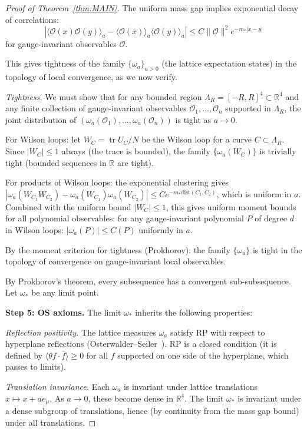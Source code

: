 \documentclass[11pt,a4paper]{article}
\theoremstyle{plain}
\theoremstyle{definition}
\theoremstyle{remark}
\newcommand{\R}{\mathbb{R}}
\newcommand{\tr}{\operatorname{tr}}
\newcommand{\cO}{\mathcal{O}}
\begin{document}
\begin{proof}[Proof of Theorem~\ref{thm:MAIN}]
The uniform mass gap implies exponential decay of
correlations:
\begin{equation}
  |\langle \cO(x) \cO(y) \rangle_a
  - \langle \cO(x) \rangle_a \langle \cO(y) \rangle_a|
  \le C \|\cO\|^2 e^{-m_* |x-y|}
\end{equation}
for gauge-invariant observables $\cO$.

This gives tightness of the family $\{\omega_a\}_{a > 0}$
(the lattice expectation states) in the topology of
local convergence, as we now verify.

\emph{Tightness.} We must show that for any bounded
region $\Lambda_R = [-R, R]^4 \subset \R^4$ and any
finite collection of gauge-invariant observables
$\cO_1, \ldots, \cO_n$ supported in $\Lambda_R$,
the joint distribution of
$(\omega_a(\cO_1), \ldots, \omega_a(\cO_n))$ is
tight as $a \to 0$.

For Wilson loops: let $W_C = \tr U_C / N$ be the
Wilson loop for a curve $C \subset \Lambda_R$.
Since $|W_C| \le 1$ always (the trace is bounded),
the family $\{\omega_a(W_C)\}$ is trivially tight
(bounded sequences in $\R$ are tight).

For products of Wilson loops: the exponential clustering
gives $|\omega_a(W_{C_1}W_{C_2})
- \omega_a(W_{C_1})\omega_a(W_{C_2})|
\le C e^{-m_* \mathrm{dist}(C_1,C_2)}$, which is
uniform in $a$. Combined with the uniform bound
$|W_C| \le 1$, this gives uniform moment bounds for
all polynomial observables: for any gauge-invariant
polynomial $P$ of degree $d$ in Wilson loops:
$|\omega_a(P)| \le C(P)$ uniformly in $a$.

By the moment criterion for tightness (Prokhorov):
the family $\{\omega_a\}$ is tight in the topology of
convergence on gauge-invariant local observables.

By Prokhorov's theorem, every subsequence has a convergent
sub-subsequence. Let $\omega_*$ be any limit point.

\medskip\noindent
\textbf{Step 5: OS axioms.}
The limit $\omega_*$ inherits the following properties:

\emph{Reflection positivity.} The lattice measures
$\omega_a$ satisfy RP with respect to hyperplane
reflections (Osterwalder--Seiler~\cite{OS78}). RP is
a closed condition (it is defined by
$\langle \theta f \cdot \bar{f} \rangle \ge 0$ for all
$f$ supported on one side of the hyperplane, which
passes to limits).

\emph{Translation invariance.} Each $\omega_a$ is
invariant under lattice translations $x \mapsto x + ae_\mu$.
As $a \to 0$, these become dense in $\R^4$. The limit
$\omega_*$ is invariant under a dense subgroup of
translations, hence (by continuity from the mass gap
bound) under all translations.


\end{proof}
\end{document}
